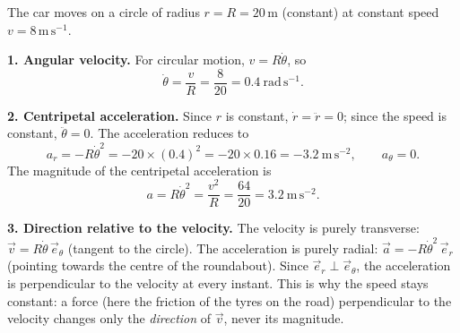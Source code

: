 \documentclass[11pt]{article}
\newcommand{\cle}[1]{{\popxbold\color{popdark}#1}}
\begin{document}
\begin{corrige}
The car moves on a circle of radius $r = R = 20\,\mathrm{m}$ (constant) at constant speed $v = 8\,\mathrm{m\,s^{-1}}$.

\textbf{1. Angular velocity.} For circular motion, $v = R\dot{\theta}$, so
\[ \dot{\theta} = \frac{v}{R} = \frac{8}{20} = 0.4\ \mathrm{rad\,s^{-1}}. \]

\textbf{2. Centripetal acceleration.} Since $r$ is constant, $\dot{r} = \ddot{r} = 0$; since the speed is constant, $\ddot{\theta} = 0$. The acceleration reduces to
\[ a_r = -R\dot{\theta}^2 = -20 \times (0.4)^2 = -20 \times 0.16 = -3.2\ \mathrm{m\,s^{-2}}, \qquad a_\theta = 0. \]
The magnitude of the centripetal acceleration is
\[ a = R\dot{\theta}^2 = \frac{v^2}{R} = \frac{64}{20} = 3.2\ \mathrm{m\,s^{-2}}. \]

\textbf{3. Direction relative to the velocity.} The velocity is purely transverse: $\vec{v} = R\dot{\theta}\,\vec{e}_\theta$ (tangent to the circle). The acceleration is purely radial: $\vec{a} = -R\dot{\theta}^2\,\vec{e}_r$ (pointing towards the centre of the roundabout). Since $\vec{e}_r \perp \vec{e}_\theta$, the acceleration is \cle{perpendicular to the velocity} at every instant. This is why the speed stays constant: a force (here the friction of the tyres on the road) perpendicular to the velocity changes only the \emph{direction} of $\vec{v}$, never its magnitude.
\end{corrige}
\end{document}
